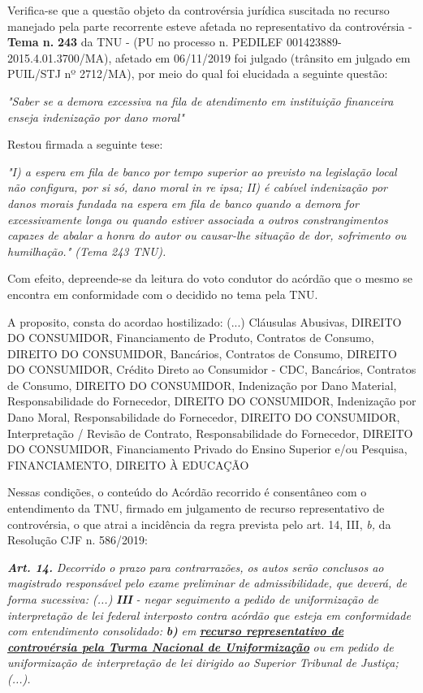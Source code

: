 \documentclass[12pt]{article}
\begin{document}
\justifying
\noindent Verifica-se que a questão objeto da controvérsia jurídica suscitada no recurso manejado pela parte recorrente esteve afetada no representativo da controvérsia - \textbf{Tema n. }\textbf{243} da TNU - (PU no processo n. PEDILEF 001423889-2015.4.01.3700/MA),  afetado em 06/11/2019 foi julgado (trânsito em julgado em PUIL/STJ nº 2712/MA), por meio do qual foi elucidada a seguinte questão:

\noindent \textit{"Saber se a demora excessiva na fila de atendimento em instituição financeira enseja indenização por dano moral"}

\noindent Restou firmada a seguinte tese:

\noindent \textit{"I) a espera em fila de banco por tempo superior ao previsto na legislação local não configura, por si só, dano moral in re ipsa; II) é cabível indenização por danos morais fundada na espera em fila de banco quando a demora for excessivamente longa ou quando estiver associada a outros constrangimentos capazes de abalar a honra do autor ou causar-lhe situação de dor, sofrimento ou humilhação." (Tema 243 TNU).}

\noindent Com efeito, depreende-se da leitura do voto condutor do acórdão que o mesmo se encontra em conformidade com o decidido no  tema pela TNU.

\noindent A proposito, consta do acordao hostilizado: (...) Cláusulas Abusivas, DIREITO DO CONSUMIDOR, Financiamento de Produto, Contratos de Consumo, DIREITO DO CONSUMIDOR, Bancários, Contratos de Consumo, DIREITO DO CONSUMIDOR, Crédito Direto ao Consumidor - CDC, Bancários, Contratos de Consumo, DIREITO DO CONSUMIDOR, Indenização por Dano Material, Responsabilidade do Fornecedor, DIREITO DO CONSUMIDOR, Indenização por Dano Moral, Responsabilidade do Fornecedor, DIREITO DO CONSUMIDOR, Interpretação / Revisão de Contrato, Responsabilidade do Fornecedor, DIREITO DO CONSUMIDOR, Financiamento Privado do Ensino Superior e/ou Pesquisa, FINANCIAMENTO, DIREITO À EDUCAÇÃO

\noindent Nessas condições, o conteúdo do Acórdão recorrido é consentâneo com o entendimento da TNU, firmado em julgamento de recurso representativo de controvérsia, o que atrai a incidência da regra prevista pelo art. 14, III, \textit{b,} da Resolução CJF n. 586/2019:

\noindent \textit{\textbf{Art. 14.}}\textit{ Decorrido o prazo para contrarrazões, os autos serão conclusos ao magistrado responsável pelo exame preliminar de admissibilidade, que deverá, de forma sucessiva: (...) }\textit{\textbf{III }}\textit{- negar seguimento a pedido de uniformização de interpretação de lei federal interposto contra acórdão que esteja em conformidade com entendimento consolidado: }\textit{\textbf{b)}}\textit{ em }\uline{\textit{\textbf{recurso representativo de controvérsia pela Turma Nacional de Uniformização}}}\textit{ ou em pedido de uniformização de interpretação de lei dirigido ao Superior Tribunal de Justiça;(...).}
\end{document}
